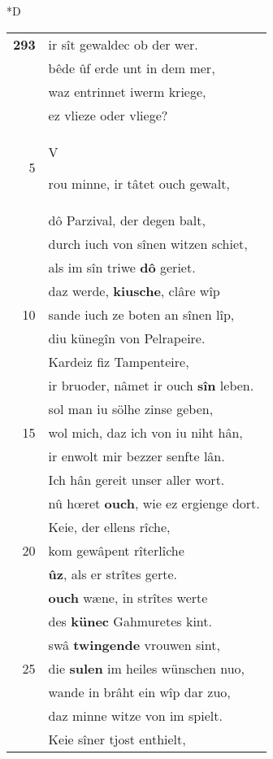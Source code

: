 \documentclass[8pt,a4paper,notitlepage]{article}
\begin{document}
\begin{table}[ht]
\begin{minipage}[t]{0.5\linewidth}
\small
\begin{center}*D
\end{center}
\begin{tabular}{rl}
\textbf{293} & ir sît gewaldec ob der wer.\\ 
 & bêde ûf erde unt in dem mer,\\ 
 & waz entrinnet iwerm kriege,\\ 
 & ez vlieze oder vliege?\\ 
5 & \begin{large}V\end{large}rou minne, ir tâtet ouch gewalt,\\ 
 & dô Parzival, der degen balt,\\ 
 & durch iuch von sînen witzen schiet,\\ 
 & als im sîn triwe \textbf{dô} geriet.\\ 
 & daz werde, \textbf{kiusche}, clâre wîp\\ 
10 & sande iuch ze boten an sînen lîp,\\ 
 & diu künegîn von Pelrapeire.\\ 
 & Kardeiz fiz Tampenteire,\\ 
 & ir bruoder, nâmet ir ouch \textbf{sîn} leben.\\ 
 & sol man iu sölhe zinse geben,\\ 
15 & wol mich, daz ich von iu niht hân,\\ 
 & ir enwolt mir bezzer senfte lân.\\ 
 & Ich hân gereit unser aller wort.\\ 
 & nû hœret \textbf{ouch}, wie ez ergienge dort.\\ 
 & Keie, der ellens rîche,\\ 
20 & kom gewâpent rîterlîche\\ 
 & \textbf{ûz}, als er strîtes gerte.\\ 
 & \textbf{ouch} wæne, in strîtes werte\\ 
 & des \textbf{künec} Gahmuretes kint.\\ 
 & swâ \textbf{twingende} vrouwen sint,\\ 
25 & die \textbf{sulen} im heiles wünschen nuo,\\ 
 & wande in brâht ein wîp dar zuo,\\ 
 & daz minne witze von im spielt.\\ 
 & Keie sîner tjost enthielt,\\ 

\end{tabular}
\end{minipage}
\end{table}
\end{document}
